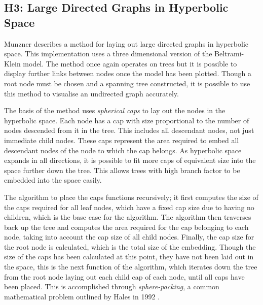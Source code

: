 \subsection{H3: Large Directed Graphs in Hyperbolic Space}

Munzner \cite{munzner_h3_1997} describes a method for laying out large directed graphs in hyperbolic space. This implementation uses a three dimensional version of the Beltrami-Klein model. The method once again operates on trees but it is possible to display further links between nodes once the model has been plotted. Though a root node must be chosen and a spanning tree constructed, it is possible to use this method to visualise an undirected graph accurately. 

The basis of the method uses \textit{spherical caps} to lay out the nodes in the hyperbolic space. Each node has a cap with size proportional to the number of nodes descended from it in the tree. This includes all descendant nodes, not just immediate child nodes. These caps represent the area required to embed all descendant nodes of the node to which the cap belongs. As hyperbolic space expands in all directions, it is possible to fit more caps of equivalent size into the space further down the tree. This allows trees with high branch factor to be embedded into the space easily.

The algorithm to place the caps functions recursively; it first computes the size of the caps required for all leaf nodes, which have a fixed cap size due to having no children, which is the base case for the algorithm. The algorithm then traverses back up the tree and computes the area required for the cap belonging to each node, taking into account the cap size of all child nodes. Finally, the cap size for the root node is calculated, which is the total size of the embedding. Though the size of the caps has been calculated at this point, they have not been laid out in the space, this is the next function of the algorithm, which iterates down the tree from the root node laying out each child cap of each node, until all caps have been placed. This is accomplished through \textit{sphere-packing}, a common mathematical problem outlined by Hales in 1992 \cite{hales_sphere_1992}.

